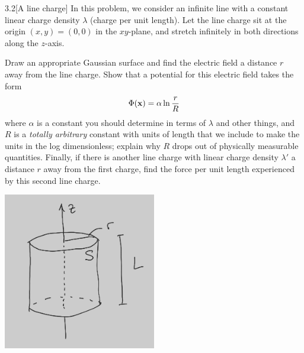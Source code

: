 \documentclass[12pt]{article}
\begin{document}
\begin{problem}{3.2}[A line charge]
In this problem, we consider an infinite line with a constant linear charge
density $\lambda$ (charge per unit length). Let the line charge sit at the
origin $(x,y)=(0,0)$ in the $xy$-plane, and stretch infinitely in both
directions along the $z$-axis.

Draw an appropriate Gaussian surface and find the electric field a distance $r$
away from the line charge. Show that a potential for this electric field takes
the form
\begin{equation}
    \Phi(\vb{x})=\alpha\ln\frac{r}{R} 
\end{equation}
where $\alpha$ is a constant you should determine in terms of $\lambda$ and
other things, and $R$ is a \textit{totally arbitrary} constant with units of
length that we include to make the units in the log dimensionless; explain why
$R$ drops out of physically measurable quantities. Finally, if there is another
line charge with linear charge density $\lambda'$ a distance $r$ away from the
first charge, find the force per unit length experienced by this second line
charge.
\begin{solution}
\begin{center}
    \includegraphics[width=0.5\textwidth]{hw3_p2.jpg} 
\end{center}


\end{solution}
\end{problem}
\end{document}
